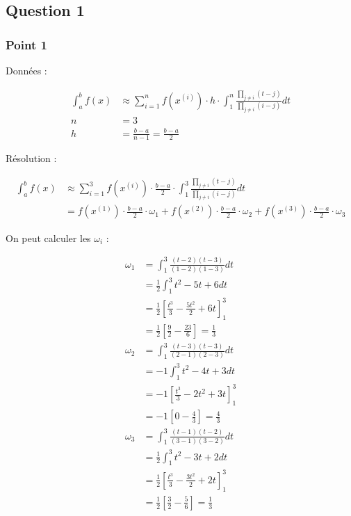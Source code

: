 \subsection{Question 1}

\subsubsection{Point 1}

Données :

\begin{equation}
	\begin{aligned}
		\int_a^b f(x) &\approx \sum_{i=1}^n f(x^{(i)}) \cdot h \cdot \int_1^n\frac{\prod_{j \neq i}(t-j)}{\prod_{j \neq i} (i - j)} dt\\
		n &= 3\\
		h &= \frac{b-a}{n-1} = \frac{b-a}{2}
	\end{aligned}
\end{equation}

Résolution :

\begin{equation}
	\begin{aligned}
		\int_a^b f(x) &\approx \sum_{i=1}^3 f(x^{(i)}) \cdot \frac{b-a}{2} \cdot \int_1^3\frac{\prod_{j \neq i}(t-j)}{\prod_{j \neq i} (i - j)} dt\\
		&= f(x^{(1)}) \cdot \frac{b-a}{2} \cdot \omega_1 + f(x^{(2)}) \cdot \frac{b-a}{2} \cdot \omega_2 + f(x^{(3)}) \cdot \frac{b-a}{2} \cdot \omega_3
	\end{aligned}
\end{equation}

On peut calculer les $\omega_i$ :

\begin{equation}
	\begin{aligned}
		\omega_1 &= \int_1^3 \frac{(t-2)(t-3)}{(1-2)(1-3)} dt\\
		&= \frac{1}{2} \int_1^3 t^2 - 5t + 6 dt\\
		&= \frac{1}{2} \left [\frac{t^3}{3} - \frac{5t^2}{2} + 6t \right ]_1^3\\
		&= \frac{1}{2}  \left [\frac{9}{2} - \frac{23}{6} \right ] = \frac{1}{3}\\
		\omega_2 &= \int_1^3 \frac{(t-3)(t-3)}{(2-1)(2-3)} dt\\
		&= -1 \int_1^3 t^2 - 4t + 3 dt\\
		&= -1  \left [\frac{t^3}{3} - 2t^2 + 3t \right ]_1^3\\
		&= -1  \left [ 0 - \frac{4}{3} \right ] = \frac{4}{3}\\
		\omega_3 &= \int_1^3 \frac{(t-1)(t-2)}{(3-1)(3-2)} dt\\
		&= \frac{1}{2} \int_1^3 t^2 - 3t + 2 dt\\
		&= \frac{1}{2}  \left [\frac{t^3}{3} - \frac{3t^2}{2} + 2t \right ]_1^3\\
		&= \frac{1}{2}  \left [ \frac{3}{2} - \frac{5}{6} \right ] = \frac{1}{3}\\
	\end{aligned}
\end{equation}

